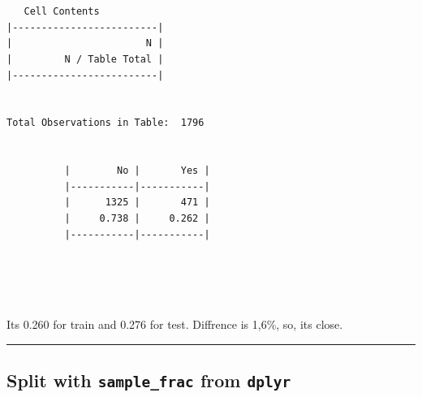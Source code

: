 \documentclass[
  letterpaper,
  DIV=11,
  numbers=noendperiod]{scrreprt}
\newenvironment{Shaded}{\begin{snugshade}}{\end{snugshade}}
\newcommand{\AttributeTok}[1]{\textcolor[rgb]{0.40,0.45,0.13}{#1}}
\newcommand{\CommentTok}[1]{\textcolor[rgb]{0.37,0.37,0.37}{#1}}
\newcommand{\DecValTok}[1]{\textcolor[rgb]{0.68,0.00,0.00}{#1}}
\newcommand{\FunctionTok}[1]{\textcolor[rgb]{0.28,0.35,0.67}{#1}}
\newcommand{\NormalTok}[1]{\textcolor[rgb]{0.00,0.23,0.31}{#1}}
\newcommand{\OtherTok}[1]{\textcolor[rgb]{0.00,0.23,0.31}{#1}}
\newcommand{\SpecialCharTok}[1]{\textcolor[rgb]{0.37,0.37,0.37}{#1}}
\begin{document}
\begin{Shaded}
\end{Shaded}

\begin{verbatim}

 
   Cell Contents
|-------------------------|
|                       N |
|         N / Table Total |
|-------------------------|

 
Total Observations in Table:  1796 

 
          |        No |       Yes | 
          |-----------|-----------|
          |      1325 |       471 | 
          |     0.738 |     0.262 | 
          |-----------|-----------|



 
\end{verbatim}

Its 0.260 for train and 0.276 for test. Diffrence is 1,6\%, so, its
close.

\begin{center}\rule{0.5\linewidth}{0.5pt}\end{center}

\subsection{\texorpdfstring{Split with \texttt{sample\_frac} from
\texttt{dplyr}}{Split with sample\_frac from dplyr}}\label{split-with-sample_frac-from-dplyr}

\begin{Shaded}
\end{Shaded}
\end{document}

